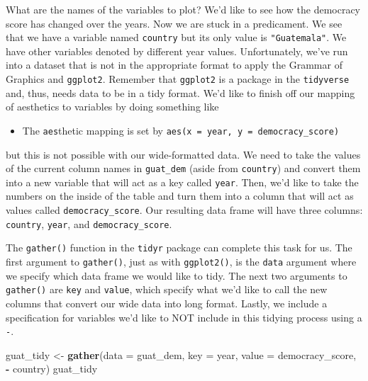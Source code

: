 \documentclass[12pt,]{krantz}
\makeatletter
\newenvironment{Shaded}{\begin{snugshade}}{\end{snugshade}}
\newcommand{\KeywordTok}[1]{\textcolor[rgb]{0.27,0.27,0.27}{\textbf{#1}}}
\newcommand{\DataTypeTok}[1]{\textcolor[rgb]{0.27,0.27,0.27}{#1}}
\newcommand{\StringTok}[1]{\textcolor[rgb]{0.5,0.5,0.5}{#1}}
\newcommand{\OperatorTok}[1]{\textcolor[rgb]{0.43,0.43,0.43}{\textbf{#1}}}
\newcommand{\NormalTok}[1]{#1}
\providecommand{\tightlist}{%
  \setlength{\itemsep}{0pt}\setlength{\parskip}{0pt}}
\newenvironment{kframe}{%
\medskip{}
\setlength{\fboxsep}{.8em}
 \def\at@end@of@kframe{}%
 \ifinner\ifhmode%
  \def\at@end@of@kframe{\end{minipage}}%
  \begin{minipage}{\columnwidth}%
 \fi\fi%
 \def\FrameCommand##1{\hskip\@totalleftmargin \hskip-\fboxsep
 \colorbox{shadecolor}{##1}\hskip-\fboxsep
     \hskip-\linewidth \hskip-\@totalleftmargin \hskip\columnwidth}%
 \MakeFramed {\advance\hsize-\width
   \@totalleftmargin\z@ \linewidth\hsize
   \@setminipage}}%
 {\par\unskip\endMakeFramed%
 \at@end@of@kframe}
\renewenvironment{Shaded}{\begin{kframe}}{\end{kframe}}
\theoremstyle{definition}
\theoremstyle{definition}
\theoremstyle{definition}
\theoremstyle{remark}
\makeatother
\begin{document}
What are the names of the variables to plot? We'd like to see how the
democracy score has changed over the years. Now we are stuck in a
predicament. We see that we have a variable named \texttt{country} but
its only value is \texttt{"Guatemala"}. We have other variables denoted
by different year values. Unfortunately, we've run into a dataset that
is not in the appropriate format to apply the Grammar of Graphics and
\texttt{ggplot2}. Remember that \texttt{ggplot2} is a package in the
\texttt{tidyverse} and, thus, needs data to be in a tidy format. We'd
like to finish off our mapping of aesthetics to variables by doing
something like

\begin{itemize}
\tightlist
\item
  The \texttt{aes}thetic mapping is set by
  \texttt{aes(x\ =\ year,\ y\ =\ democracy\_score)}
\end{itemize}

but this is not possible with our wide-formatted data. We need to take
the values of the current column names in \texttt{guat\_dem} (aside from
\texttt{country}) and convert them into a new variable that will act as
a key called \texttt{year}. Then, we'd like to take the numbers on the
inside of the table and turn them into a column that will act as values
called \texttt{democracy\_score}. Our resulting data frame will have
three columns: \texttt{country}, \texttt{year}, and
\texttt{democracy\_score}.

The \texttt{gather()} function in the \texttt{tidyr} package can
complete this task for us. The first argument to \texttt{gather()}, just
as with \texttt{ggplot2()}, is the \texttt{data} argument where we
specify which data frame we would like to tidy. The next two arguments
to \texttt{gather()} are \texttt{key} and \texttt{value}, which specify
what we'd like to call the new columns that convert our wide data into
long format. Lastly, we include a specification for variables we'd like
to NOT include in this tidying process using a \texttt{-}.

\begin{Shaded}
\begin{Highlighting}[]
\NormalTok{guat_tidy <-}\StringTok{ }\KeywordTok{gather}\NormalTok{(}\DataTypeTok{data =}\NormalTok{ guat_dem, }
                    \DataTypeTok{key =}\NormalTok{ year,}
                    \DataTypeTok{value =}\NormalTok{ democracy_score,}
                    \OperatorTok{-}\StringTok{ }\NormalTok{country) }
\NormalTok{guat_tidy}
\end{Highlighting}
\end{Shaded}
\end{document}
